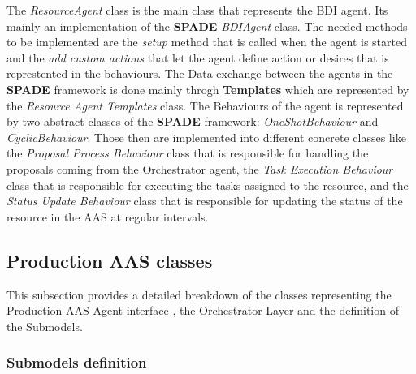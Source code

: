 The \emph{ResourceAgent} class is the main class that represents the BDI agent.
Its mainly an implementation of the \textbf{SPADE} \emph{BDIAgent} class.
The needed methods to be implemented are the \emph{setup} method that is called when the agent is started and the \emph{add custom actions} that let the agent define action or desires that is represtented in the behaviours.
The Data exchange between the agents in the \textbf{SPADE} framework is done mainly throgh \textbf{Templates} which are represented by the \emph{Resource Agent Templates} class.
The Behaviours of the agent is represented by two abstract classes of the \textbf{SPADE} framework: \emph{OneShotBehaviour} and \emph{CyclicBehaviour}.
Those then are implemented into different concrete classes like the \emph{Proposal Process Behaviour} class that is responsible for handling the proposals coming from the Orchestrator agent, the \emph{Task Execution Behaviour} class that is responsible for executing the tasks assigned to the resource, and the \emph{Status Update Behaviour} class that is responsible for updating the status of the resource in the AAS at regular intervals.

\newpage
\subsection{Production AAS classes}
This subsection provides a detailed breakdown of the classes representing the Production AAS-Agent interface , the Orchestrator Layer and the definition of the Submodels.

\subsubsection{Submodels definition}

